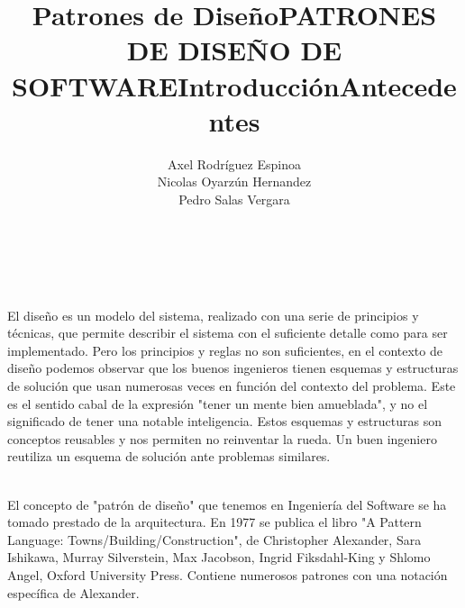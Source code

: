 \documentclass[a4paper,11pt]{report}
\begin{document}
\title{Patrones de Diseño}
\author{Axel Rodríguez Espinoa\\
        Nicolas Oyarzún Hernandez\\
        Pedro Salas Vergara}
\maketitle

\title {\textbf{PATRONES DE DISEÑO DE SOFTWARE}}\\

\title{\textbf{Introducción}}\\

El diseño es un modelo del sistema, realizado con una serie de principios y técnicas, que permite describir el sistema con el suficiente detalle como para ser implementado. Pero los principios y reglas no son suficientes, en el contexto de diseño podemos observar que los buenos ingenieros tienen esquemas y estructuras de solución que usan numerosas veces en función del contexto del problema. Este es el sentido cabal de la expresión "tener un mente bien amueblada", y no el significado de tener una notable inteligencia. Estos esquemas y estructuras son conceptos reusables y nos permiten no reinventar la rueda. Un buen ingeniero reutiliza un esquema de solución ante problemas similares.\\

\title{\textbf{Antecedentes}}\\

El concepto de "patrón de diseño" que tenemos en Ingeniería del Software se ha tomado prestado de la arquitectura. En 1977 se publica el libro "A Pattern Language: Towns/Building/Construction", de Christopher Alexander, Sara Ishikawa, Murray Silverstein, Max Jacobson, Ingrid Fiksdahl-King y Shlomo Angel, Oxford University Press. Contiene numerosos patrones con una notación específica de Alexander.\\
\end{document}
